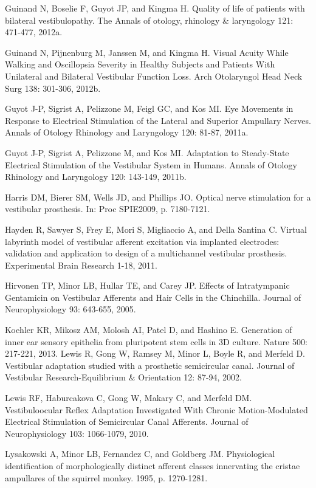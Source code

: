 {Guinand N, Boselie F, Guyot JP, and Kingma H. Quality of life of patients with bilateral vestibulopathy. The Annals of otology, rhinology \& laryngology 121: 471-477, 2012a.

Guinand N, Pijnenburg M, Janssen M, and Kingma H. Visual Acuity While Walking and Oscillopsia Severity in Healthy Subjects and Patients With Unilateral and Bilateral Vestibular Function Loss. Arch Otolaryngol Head Neck Surg 138: 301-306, 2012b.

Guyot J-P, Sigrist A, Pelizzone M, Feigl GC, and Kos MI. Eye Movements in Response to Electrical Stimulation of the Lateral and Superior Ampullary Nerves. Annals of Otology Rhinology and Laryngology 120: 81-87, 2011a.

Guyot J-P, Sigrist A, Pelizzone M, and Kos MI. Adaptation to Steady-State Electrical Stimulation of the Vestibular System in Humans. Annals of Otology Rhinology and Laryngology 120: 143-149, 2011b.

Harris DM, Bierer SM, Wells JD, and Phillips JO. Optical nerve stimulation for a vestibular prosthesis. In: Proc SPIE2009, p. 7180-7121.

Hayden R, Sawyer S, Frey E, Mori S, Migliaccio A, and Della Santina C. Virtual labyrinth model of vestibular afferent excitation via implanted electrodes: validation and application to design of a multichannel vestibular prosthesis. Experimental Brain Research 1-18, 2011.

Hirvonen TP, Minor LB, Hullar TE, and Carey JP. Effects of Intratympanic Gentamicin on Vestibular Afferents and Hair Cells in the Chinchilla. Journal of Neurophysiology 93: 643-655, 2005.

Koehler KR, Mikosz AM, Molosh AI, Patel D, and Hashino E. Generation of inner ear sensory epithelia from pluripotent stem cells in 3D culture. Nature 500: 217-221, 2013.
Lewis R, Gong W, Ramsey M, Minor L, Boyle R, and Merfeld D. Vestibular adaptation studied with a prosthetic semicircular canal. Journal of Vestibular Research-Equilibrium \& Orientation 12: 87-94, 2002.

Lewis RF, Haburcakova C, Gong W, Makary C, and Merfeld DM. Vestibuloocular Reflex Adaptation Investigated With Chronic Motion-Modulated Electrical Stimulation of Semicircular Canal Afferents. Journal of Neurophysiology 103: 1066-1079, 2010.

Lysakowski A, Minor LB, Fernandez C, and Goldberg JM. Physiological identification of morphologically distinct afferent classes innervating the cristae ampullares of the squirrel monkey. 1995, p. 1270-1281.

}
